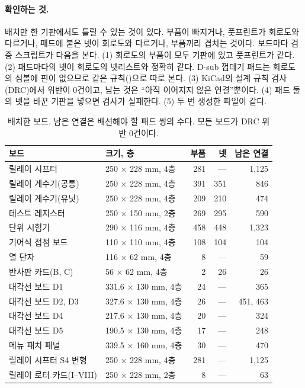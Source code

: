 \paragraph{확인하는 것.} 배치만 한 기판에서도 틀릴 수 있는 것이 있다. 부품이 빠지거나, 풋프린트가 회로도와
다르거나, 패드에 붙은 넷이 회로도와 다르거나, 부품끼리 겹치는 것이다. 보드마다 검증 스크립트가 다음을 본다.
(1) 회로도의 부품이 모두 기판에 있고 풋프린트가 같다. (2) 패드마다의 넷이 회로도의 넷리스트와 정확히 같다.
D-sub 껍데기 패드는 회로도의 심볼에 핀이 없으므로 같은 규칙()으로 따로 본다. (3) KiCad의 설계 규칙
검사(DRC)에서 위반이 0건이고, 남는 것은 ``아직 이어지지 않은 연결''뿐이다. (4) 패드 둘의 넷을 바꾼 기판을 넣으면
검사가 실패한다. (5) 두 번 생성한 파일이 같다.

\begin{table}[ht]
\centering
\caption{배치한 보드. 남은 연결은 배선해야 할 패드 쌍의 수다. 모든 보드가 DRC 위반 0건이다.}
\label{tab:pcb-boards}
\small
\begin{tabularx}{\linewidth}{>{\raggedright\arraybackslash}Xlrrr}
\toprule
보드 & 크기, 층 & 부품 & 넷 & 남은 연결 \\
\midrule
릴레이 시프터 & 250 × 228 mm, 4층 & 281 & --- & 1,125 \\
릴레이 계수기(공통) & 250 × 228 mm, 4층 & 391 & 351 & 846 \\
릴레이 계수기(유닛) & 250 × 228 mm, 4층 & 209 & 210 & 474 \\
테스트 레지스터 & 250 × 150 mm, 2층 & 269 & 295 & 590 \\
단위 시험기 & 290 × 116 mm, 4층 & 458 & 448 & 1,323 \\
기어식 접점 보드 & 110 × 110 mm, 4층 & 108 & 104 & 104 \\
열 단자 & 116 × 62 mm, 4층 & 8 & --- & 59 \\
반사판 카드(B, C) & 56 × 62 mm, 4층 & 2 & 26 & 26 \\
대각선 보드 D1 & 331.6 × 130 mm, 4층 & 24 & --- & 365 \\
대각선 보드 D2, D3 & 327.6 × 130 mm, 4층 & 26 & --- & 451, 463 \\
대각선 보드 D4 & 217.6 × 130 mm, 4층 & 20 & --- & 324 \\
대각선 보드 D5 & 190.5 × 130 mm, 4층 & 17 & --- & 248 \\
메뉴 패치 패널 & 339.5 × 160 mm, 4층 & 30 & --- & 470 \\
릴레이 시프터 S4 변형 & 250 × 228 mm, 4층 & 281 & --- & 1,125 \\
릴레이 로터 카드(I--VIII) & 250 × 228 mm, 2층 & 8 & --- & 63 \\

\end{tabularx}
\end{table}
